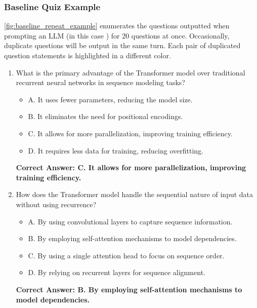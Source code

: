 \subsubsection{Baseline Quiz Example}
\label{subsubsec:example_baseline}
\autoref{fig:baseline_repeat_example} enumerates the questions outputted when prompting an LLM (in this case \gpt) for 20 questions at once. Occasionally, duplicate questions will be output in the same turn. Each pair of duplicated question statements is highlighted in a different color.

\begin{figure*}
\centering
\begin{tcolorbox}[width=\textwidth,fontupper=\footnotesize,title=Repeated Baseline Questions]

\begin{enumerate}
    \item What is the primary advantage of the Transformer model over traditional recurrent neural networks in sequence modeling tasks?
    \begin{itemize}
        \item A. It uses fewer parameters, reducing the model size.
        \item B. It eliminates the need for positional encodings.
        \item C. It allows for more parallelization, improving training efficiency.
        \item D. It requires less data for training, reducing overfitting.
    \end{itemize}
    \textbf{Correct Answer: C. It allows for more parallelization, improving training efficiency.}

    \item How does the Transformer model handle the sequential nature of input data without using recurrence?
    \begin{itemize}
        \item A. By using convolutional layers to capture sequence information.
        \item B. By employing self-attention mechanisms to model dependencies.
        \item C. By using a single attention head to focus on sequence order.
        \item D. By relying on recurrent layers for sequence alignment.
    \end{itemize}
    \textbf{Correct Answer: B. By employing self-attention mechanisms to model dependencies.}


\end{enumerate}
\end{tcolorbox}
\end{figure*}
